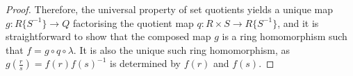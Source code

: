 \documentclass[10pt,a4paper]{amsart}
\begin{document}
\begin{proof}
Therefore, the universal property of set quotients yields a unique map $g : R\{S^{-1}\} \rightarrow Q$ factorising the quotient map $q : R \times S \rightarrow R\{S^{-1}\}$, and it is straightforward to show that the composed map $g$ is a ring homomorphism such that $f = g \circ q \circ \lambda$. It is also the unique such ring homomorphism, as $g(\frac{r}{s}) = f(r)f(s)^{-1}$ is determined by $f(r)$ and $f(s)$.  
\end{proof}
\end{document}
